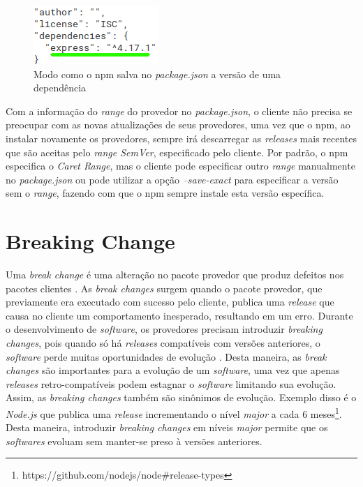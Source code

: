 \begin{figure}
    \centering
    \includegraphics{figuras/dependencies_express.png}
    \caption{Modo como o \gls{npm} salva no \textit{package.json} a versão de uma dependência}
    \label{fig:dep_express}
\end{figure}{}

Com a informação do \textit{range} do provedor no \textit{package.json}, o cliente não precisa se preocupar com as novas atualizações de seus provedores, uma vez que o \gls{npm}, ao instalar novamente os provedores, sempre irá descarregar as \textit{releases} mais recentes que são aceitas pelo \textit{range SemVer}, especificado pelo cliente. Por padrão, o \gls{npm} especifica o \textit{Caret Range}, mas o cliente pode especificar outro \textit{range} manualmente no \textit{package.json} ou pode utilizar a opção \textit{--save-exact} para especificar a versão sem o \textit{range}, fazendo com que o \gls{npm} sempre instale esta versão específica.

\section{Breaking Change}
\label{ref-teo:breaking_change}
Uma \textit{break change} é uma alteração no pacote provedor que produz defeitos nos pacotes clientes \cite{teorical_reference:semver}. As \textit{break changes} surgem quando o pacote provedor, que previamente era executado com sucesso pelo cliente, publica uma \textit{release} que causa no cliente um comportamento inesperado, resultando em um erro. Durante o desenvolvimento de \textit{software}, os provedores precisam introduzir \textit{breaking changes}, pois quando só há \textit{releases} compatíveis com versões anteriores, o \textit{software} perde muitas oportunidades de evolução \cite{teorical_reference:bc_2}. Desta maneira, as \textit{break changes} são importantes para a evolução de um \textit{software}, uma vez que apenas \textit{releases} retro-compatíveis podem estagnar o \textit{software} limitando sua evolução. Assim, as \textit{breaking changes} também são sinônimos de evolução. Exemplo disso é o \textit{Node.js} que publica uma \textit{release} incrementando o nível \textit{major} a cada 6 meses\footnote{https://github.com/nodejs/node\#release-types}. Desta maneira, introduzir \textit{breaking changes} em níveis \textit{major} permite que os \textit{softwares} evoluam sem manter-se preso à versões anteriores.

